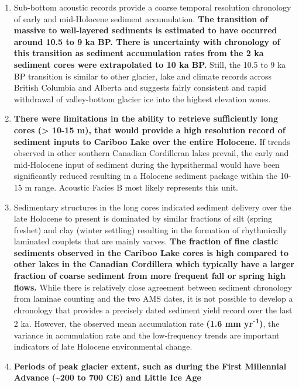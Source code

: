 \documentclass[Royal,times,doublespace,sageh]{sagej}
\providecommand{\tightlist}{%
  \setlength{\itemsep}{0pt}\setlength{\parskip}{0pt}}
\begin{document}
\begin{enumerate}
\def\labelenumi{\arabic{enumi}.}
\tightlist
\item
  Sub-bottom acoustic records provide a coarse temporal resolution
  chronology of early and mid-Holocene sediment accumulation.
  \textbf{The transition of massive to well-layered sediments is
  estimated to have occurred around 10.5 to 9 ka BP. There is
  uncertainty with chronology of this transition as sediment
  accumulation rates from the 2 ka sediment cores were extrapolated to
  10 ka BP.} Still, the 10.5 to 9 ka BP transition is similar to other
  glacier, lake and climate records across British Columbia and Alberta
  and suggests fairly consistent and rapid withdrawal of valley-bottom
  glacier ice into the highest elevation zones.
\item
  \textbf{There were limitations in the ability to retrieve sufficiently
  long cores (\textgreater{} 10-15 m), that would provide a high
  resolution record of sediment inputs to Cariboo Lake over the entire
  Holocene.} If trends observed in other southern Canadian Cordilleran
  lakes prevail, the early and mid-Holocene input of sediment during the
  hypsithermal would have been significantly reduced resulting in a
  Holocene sediment package within the 10-15 m range. Acoustic Facies B
  most likely represents this unit.
\item
  Sedimentary structures in the long cores indicated sediment delivery
  over the late Holocene to present is dominated by similar fractions of
  silt (spring freshet) and clay (winter settling) resulting in the
  formation of rhythmically laminated couplets that are mainly varves.
  \textbf{The fraction of fine clastic sediments observed in the Cariboo
  Lake cores is high compared to other lakes in the Canadian Cordillera
  which typically have a larger fraction of coarse sediment from more
  frequent fall or spring high flows.} While there is relatively close
  agreement between sediment chronology from laminae counting and the
  two AMS dates, it is not possible to develop a chronology that
  provides a precisely dated sediment yield record over the last 2 ka.
  However, the observed mean accumulation rate \textbf{(1.6 mm
  yr\textsuperscript{-1})}, the variance in accumulation rate and the
  low-frequency trends are important indicators of late Holocene
  environmental change.
\item
  \textbf{Periods of peak glacier extent, such as during the First
  Millennial Advance (\textasciitilde200 to 700 CE) and Little Ice Age
}
\end{enumerate}
\end{document}

